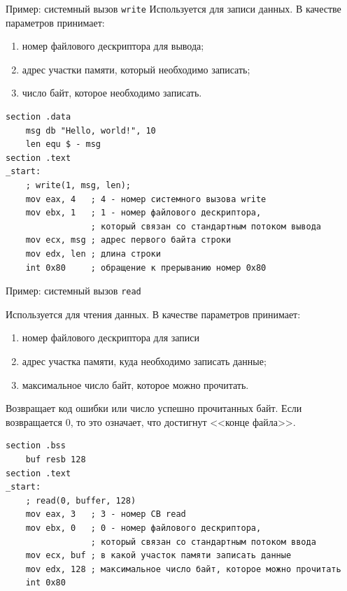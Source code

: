 \documentclass[utf8, russian, aspectratio=1610]{beamer}
\begin{document}
    \begin{frame}[fragile]{Пример: системный вызов {\tt write}}
    Используется для записи данных. В качестве параметров принимает:
    \begin{enumerate}
        \item номер файлового дескриптора для вывода;
        \item адрес участки памяти, который необходимо записать;
        \item число байт, которое необходимо записать.
    \end{enumerate}

\begin{verbatim}
section .data
    msg db "Hello, world!", 10
    len equ $ - msg
section .text
_start:
    ; write(1, msg, len);
    mov eax, 4   ; 4 - номер системного вызова write
    mov ebx, 1   ; 1 - номер файлового дескриптора,
                 ; который связан со стандартным потоком вывода
    mov ecx, msg ; адрес первого байта строки
    mov edx, len ; длина строки
    int 0x80     ; обращение к прерыванию номер 0x80 
\end{verbatim}
\end{frame}
\begin{frame}[fragile]{Пример: системный вызов {\tt read}}

    Используется для чтения данных. В качестве параметров принимает:
    \begin{enumerate}
        \item номер файлового дескриптора для записи
        \item адрес участка памяти, куда необходимо записать данные;
        \item максимальное число байт, которое можно прочитать.
    \end{enumerate}
    Возвращает код ошибки или число успешно прочитанных байт. Если возвращается $0$, 
    то это означает, что достигнут <<конце файла>>.

\begin{verbatim}
section .bss
    buf resb 128
section .text
_start:
    ; read(0, buffer, 128)
    mov eax, 3   ; 3 - номер СВ read
    mov ebx, 0   ; 0 - номер файлового дескриптора,
                 ; который связан со стандартным потоком ввода
    mov ecx, buf ; в какой участок памяти записать данные
    mov edx, 128 ; максимальное число байт, которое можно прочитать
    int 0x80
\end{verbatim}
\end{frame}
\end{document}
